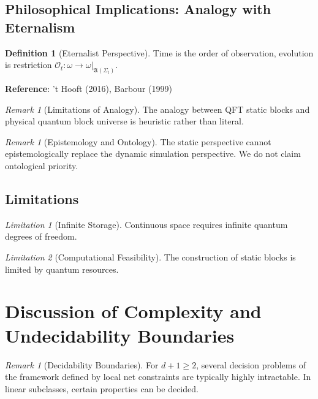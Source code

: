 \documentclass[11pt]{article}
\theoremstyle{definition}
\newtheorem{definition}[theorem]{Definition}
\theoremstyle{remark}
\newtheorem{remark}[theorem]{Remark}
\newtheorem{limitation}{Limitation}
\begin{document}
\subsection{Philosophical Implications: Analogy with Eternalism}

\begin{definition}[Eternalist Perspective]\label{def:eternal}
Time is the order of observation, evolution is restriction \( \mathcal{O}_t: \omega \to \omega|_{\mathfrak{A}(\Sigma_t)} \).

\textbf{Reference}: 't Hooft (2016), Barbour (1999)
\end{definition}

\begin{remark}[Limitations of Analogy]
The analogy between QFT static blocks and physical quantum block universe is heuristic rather than literal.
\end{remark}

\begin{remark}[Epistemology and Ontology]
The static perspective cannot epistemologically replace the dynamic simulation perspective. We do not claim ontological priority.
\end{remark}

\subsection{Limitations}

\begin{limitation}[Infinite Storage]
Continuous space requires infinite quantum degrees of freedom.
\end{limitation}

\begin{limitation}[Computational Feasibility]
The construction of static blocks is limited by quantum resources.
\end{limitation}

\section{Discussion of Complexity and Undecidability Boundaries}\label{sec:complexity}

\begin{remark}[Decidability Boundaries]
For \( d+1 \ge 2 \), several decision problems of the framework defined by local net constraints are typically highly intractable. In linear subclasses, certain properties can be decided.
\end{remark}
\end{document}
